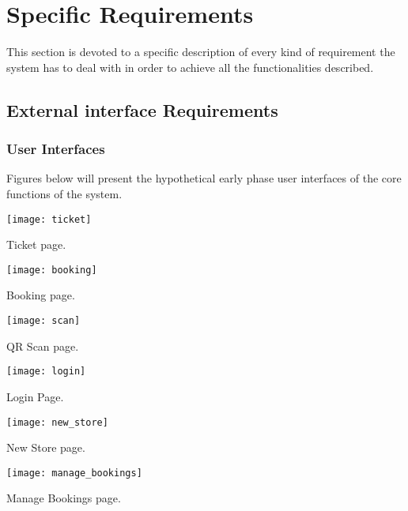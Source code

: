 \chapter{Specific Requirements}
This section is devoted to a specific description of every kind of requirement the
system has to deal with in order to achieve all the functionalities described.

\section{External interface Requirements}
\subsection{User Interfaces}
Figures below will present the hypothetical early phase user interfaces of the core functions of the system.

\vspace{0.5cm}
\begin{minipage}{.5\textwidth}
	\centering
	\texttt{[image: ticket]}
	\captionsetup{type=figure}
	\caption{Ticket page.}
\end{minipage}%
\begin{minipage}{.5\textwidth}
	\centering
	\texttt{[image: booking]}
	\captionsetup{type=figure}
	\caption{Booking page.}
\end{minipage}

\clearpage

\begin{minipage}{.5\textwidth}
	\centering
	\texttt{[image: scan]}
	\captionsetup{type=figure}
	\caption{QR Scan page.}
\end{minipage}%
\begin{minipage}{.5\textwidth}
	\centering
	\texttt{[image: login]}
	\captionsetup{type=figure}
	\caption{Login Page.}
\end{minipage}

\bigskip\bigskip

\begin{minipage}{.5\textwidth}
	\centering
	\texttt{[image: new\_store]}
	\captionsetup{type=figure}
	\caption{New Store page.}
\end{minipage}%
\begin{minipage}{.5\textwidth}
	\centering
	\texttt{[image: manage\_bookings]}
	\captionsetup{type=figure}
	\caption{Manage Bookings page.}
\end{minipage}

